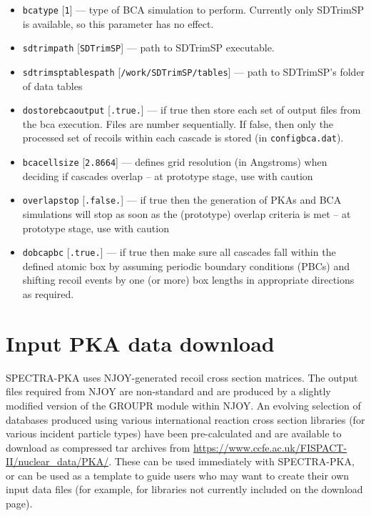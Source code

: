 \documentclass[a4paper]{article}
\begin{document}
\begin{itemize}
\item \texttt{bca{\textunderscore}type} [\texttt{1}] --- type of BCA simulation to perform. Currently only SDTrimSP is available, so this parameter has no effect.

\item \texttt{sdtrim{\textunderscore}path} [\texttt{SDTrimSP}] --- path to SDTrimSP executable.

\item \texttt{sdtrimsptablespath} [\texttt{/work/SDTrimSP/tables}] --- path to SDTrimSP's folder of data tables

\item \texttt{do{\textunderscore}store{\textunderscore}bca{\textunderscore}output} [\texttt{.true.}] --- if true then store each set of output files from the bca execution. Files are number sequentially. If false, then only the processed set of recoils within each cascade is stored (in \texttt{config{\textunderscore}bca.dat}).

\item \texttt{bca{\textunderscore}cell{\textunderscore}size} [\texttt{2.8664}] --- defines grid resolution (in Angstroms) when deciding if cascades overlap -- at prototype stage, use with caution

\item \texttt{overlap{\textunderscore}stop} [\texttt{.false.}] --- if true then the generation of PKAs and BCA simulations will stop as soon as the (prototype) overlap criteria is met -- at prototype stage, use with caution

\item \texttt{do{\textunderscore}bca{\textunderscore}pbc} [\texttt{.true.}] --- if true then make sure all cascades fall within the defined atomic box by assuming periodic boundary conditions (PBCs) and shifting recoil events by one (or more) box lengths in appropriate directions as required.


\end{itemize}


\section{Input PKA data download}

SPECTRA-PKA uses NJOY-generated recoil cross section matrices. The output files required from NJOY are non-standard and are produced by a slightly modified version of the GROUPR module within NJOY. An evolving selection of databases produced using various international reaction cross section libraries (for various incident particle types) have been pre-calculated and are available to download as compressed tar archives from \url{https://www.ccfe.ac.uk/FISPACT-II/nuclear_data/PKA/}. These can be used immediately with SPECTRA-PKA, or can be used as a template to guide users who may want to create their own input data files (for example, for libraries not currently included on the download page).
\end{document}
